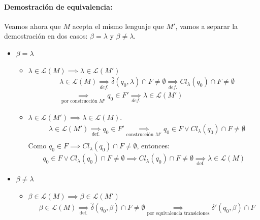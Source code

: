 \paragraph{Demostración de equivalencia:} Veamos ahora que \(M\) acepta el mismo lenguaje que \(M'\), vamos a separar la demostración en dos casos: \(\beta=\lambda\) y \(\beta \neq \lambda\).
\begin{itemize}
  \item \(\beta=\lambda\)
        \begin{itemize}
          \item \(\lambda\in\mathcal{L}(M) \implies \lambda\in\mathcal{L}(M')\)
                \begin{align*}
                   & \lambda\in \mathcal{L}(M)  \underset{def.}{\implies} \hat\delta(q_0,\lambda)\cap F \neq \emptyset \underset{def.}{\implies} Cl_{\lambda}(q_0)\cap F \neq \emptyset \\
                   & \underset{\text{por construcción }M'}{\implies} q_0\in F' \underset{def.}{\implies} \lambda\in \mathcal{L}(M')
                \end{align*}
          \item \(\lambda\in\mathcal{L}(M') \implies \lambda\in\mathcal{L}(M)\).
                \begin{align*}
                   & \lambda\in \mathcal{L}(M')  \underset{\text{def.}}{\implies} q_0\in F' \underset{\text{construcción } M'}{\implies} q_0\in F \lor Cl_\lambda(q_0)\cap F \neq\emptyset \\
                \end{align*}
                Como \(q_0\in F \implies Cl_\lambda(q_0)\cap F \neq\emptyset\), entonces:
                \begin{align*}
                  q_0\in F \lor Cl_\lambda(q_0)\cap F \neq\emptyset \implies Cl_\lambda(q_0)\cap F \neq\emptyset \underset{\text{def.}}{\implies} \lambda\in \mathcal{L}(M)
                \end{align*}
        \end{itemize}
  \item \(\beta \neq \lambda\)
        \begin{itemize}
          \item \(\beta\in\mathcal{L}(M) \implies \beta\in\mathcal{L}(M')\)
                \begin{align*}
                   & \beta\in \mathcal{L}(M) \underset{\text{def.}}{\implies} \hat\delta(q_0,\beta)\cap F \neq \emptyset \underset{\text{por equivalencia transiciones}}{\implies} \delta'(q_0,\beta)\cap F \\

\end{align*}
\end{itemize}
\end{itemize}
